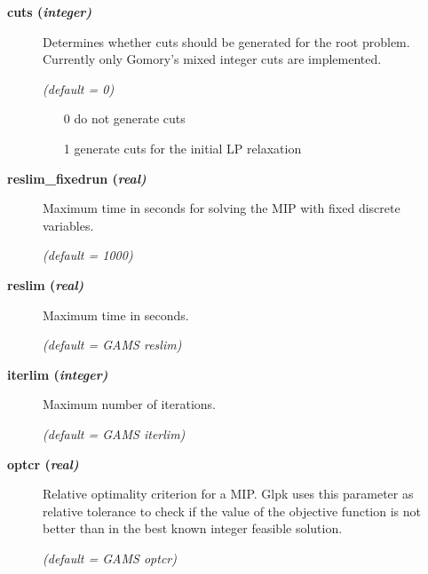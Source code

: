 \begin{description}
\item[\label{glpkcuts}\hypertarget{glpkcuts}
{\textbf{cuts (\slshape{integer})}}]\hspace{1.0in}

Determines whether cuts should be generated for the root problem.
Currently only Gomory's mixed integer cuts are implemented.

\textsl{(default = 0)}
\begin{itemize}
\item[0] do not generate cuts
\item[1] generate cuts for the initial LP relaxation
\end{itemize}

\item[\label{reslim_fixedrun}\hypertarget{reslim_fixedrun}
{\textbf{reslim_fixedrun (\slshape{real})}}]\hspace{1.0in}

Maximum time in seconds for solving the MIP with fixed discrete variables.

\textsl{(default = 1000)}

\item[\label{glpkreslim}\hypertarget{glpkreslim}
{\textbf{reslim (\slshape{real})}}]\hspace{1.0in}

Maximum time in seconds.

\textsl{(default = GAMS reslim)}

\item[\label{glpkiterlim}\hypertarget{glpkiterlim}
{\textbf{iterlim (\slshape{integer})}}]\hspace{1.0in}

Maximum number of iterations.

\textsl{(default = GAMS iterlim)}

\item[\label{glpkoptcr}\hypertarget{glpkoptcr}
{\textbf{optcr (\slshape{real})}}]\hspace{1.0in}

Relative optimality criterion for a MIP.
Glpk uses this parameter as relative tolerance to check if the value of the objective function is not better than in the best known integer feasible solution.

\textsl{(default = GAMS optcr)}
\end{description}
